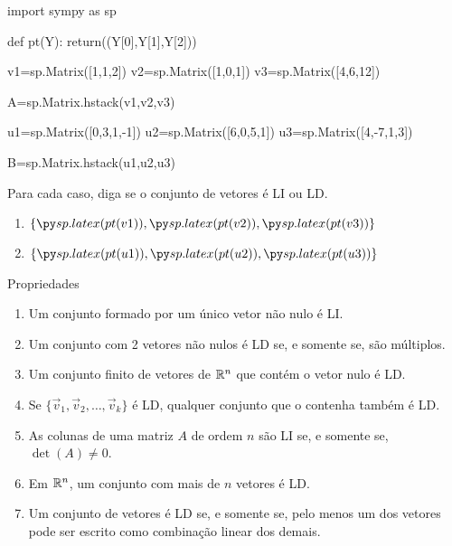 \begin{frame}[label=lild,fragile=singleslide]{}
\begin{pycode}
import sympy as sp

def pt(Y):
 return((Y[0],Y[1],Y[2]))

v1=sp.Matrix([1,1,2])
v2=sp.Matrix([1,0,1])
v3=sp.Matrix([4,6,12])

A=sp.Matrix.hstack(v1,v2,v3)


u1=sp.Matrix([0,3,1,-1])
u2=sp.Matrix([6,0,5,1])
u3=sp.Matrix([4,-7,1,3])

B=sp.Matrix.hstack(u1,u2,u3)
\end{pycode}
\begin{casa}
Para cada caso, diga se o conjunto de vetores é LI ou LD.

\begin{enumerate}
\item $\{\pyl{pt(v1)},\pyl{pt(v2)}, \pyl{pt(v3)}\}$
\item $\{\pyl{pt(u1)},\pyl{pt(u2)}, \pyl{pt(u3)}\}$
\end{enumerate}
\end{casa}

\end{frame}




\begin{frame}[label=lild]{Propriedades}

\begin{enumerate}
\item Um conjunto formado por um único vetor não nulo é LI.

\item Um conjunto com 2 vetores não nulos é LD se, e somente se, são múltiplos.

\item Um conjunto finito de vetores de $\mathbb{R}^n$ que contém o vetor nulo é LD.

\item Se $\{\vec{v}_1,\vec{v}_2,\ldots,\vec{v}_k\}$ é LD, qualquer conjunto que o contenha também é LD.

\item As colunas de uma matriz $A$ de ordem $n$ são LI se, e somente se, $\det(A)\neq 0$.

\item Em $\mathbb{R}^n$, um conjunto com mais de $n$ vetores é LD.

\item Um conjunto de vetores é LD se, e somente se, {\color{red} pelo menos um dos vetores} pode ser escrito como combinação linear dos demais.
\end{enumerate}


\end{frame}

